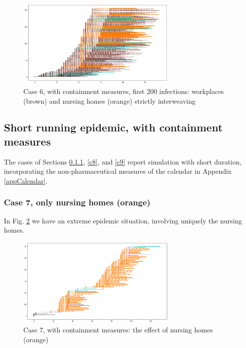 \documentclass[11pt]{article}
\begin{document}
\begin{figure}[H]
\begin{center}
\includegraphics[width=0.7\textwidth]{with8b.png}%
\caption{Case 6, with containment measures, first 200 infections: workplaces (brown) and nursing homes (orange) strictly interweaving}
\label{8b}
\end{center}
\end{figure}

\subsection{Short running epidemic, with containment measures}

The cases of Sections \ref{c7}, \ref{c8}, and \ref {c9} report simulation with short duration, incorporating the non-pharmaceutical measures of the calendar in Appendix \ref{appCalendar}.


\subsubsection{Case 7, only nursing homes (orange)}
\label{c7}


In Fig. \ref{0} we have an extreme epidemic situation, involving uniquely the nursing homes.

\begin{figure}[H]
\begin{center}
\includegraphics[width=0.7\textwidth]{withShort0.png}%
\caption{Case 7, with containment measures: the effect of nursing homes (orange)}
\label{0}
\end{center}
\end{figure}
\end{document}
